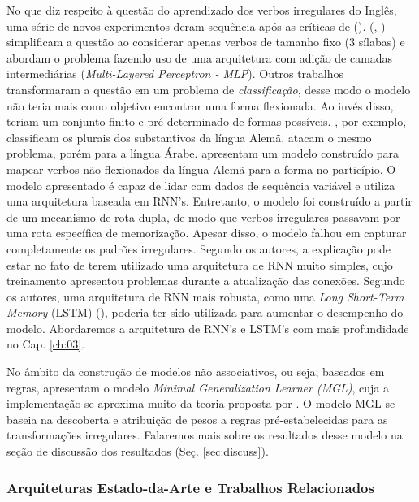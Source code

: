 No que diz respeito à questão do aprendizado dos verbos irregulares do Inglês, uma série de novos experimentos deram sequência após as críticas de (\cite{Pinker:1988}). (\cite{pluket:1991}, \citeyear{PLUNKETT:1993}) simplificam a questão ao considerar apenas verbos de tamanho fixo (3 sílabas) e abordam o problema fazendo uso de uma arquitetura com adição de camadas intermediárias (\textit{Multi-Layered Perceptron - MLP}). Outros trabalhos transformaram a questão em um problema de \textit{classificação}, desse modo o modelo não teria mais como objetivo encontrar uma forma flexionada. Ao invés disso, teriam um conjunto finito e pré determinado de formas possíveis. \cite{Nakisa1996WhereDD}, por exemplo, classificam os plurais dos substantivos da língua Alemã. \cite{plunkett:1997} atacam o mesmo problema, porém para a língua Árabe. \cite{wetermann:1997} apresentam um modelo construído para mapear verbos não flexionados da língua Alemã para a forma no particípio. O modelo apresentado é capaz de lidar com dados de sequência variável e utiliza uma arquitetura baseada em RNN's. Entretanto, o modelo foi construído a partir de um mecanismo de rota dupla, de modo que verbos irregulares passavam por uma rota específica de memorização. Apesar disso, o modelo falhou em capturar completamente os padrões irregulares. Segundo os autores, a explicação pode estar no fato de terem utilizado uma arquitetura de RNN muito simples, cujo treinamento apresentou problemas durante a atualização das conexões. Segundo os autores, uma arquitetura de RNN mais robusta, como uma \textit{Long Short-Term Memory} (LSTM) (\cite{hochreiter:1997}), poderia ter sido utilizada para aumentar o desempenho do modelo. Abordaremos a arquitetura de RNN's e LSTM's com mais profundidade no Cap. \ref{ch:03}.

No âmbito da construção de modelos não associativos, ou seja, baseados em regras, \cite{Albright2003RulesVA} apresentam o modelo \textit{Minimal Generalization Learner (MGL)}, cuja a implementação se aproxima muito da teoria proposta por \cite{Pinker:1988}. O modelo MGL se baseia na descoberta e atribuição de pesos a regras pré-estabelecidas para as transformações irregulares. Falaremos mais sobre os resultados desse modelo na seção de discussão dos resultados (Seç. \ref{sec:discuss}).

\subsubsection{Arquiteturas Estado-da-Arte e Trabalhos Relacionados}

